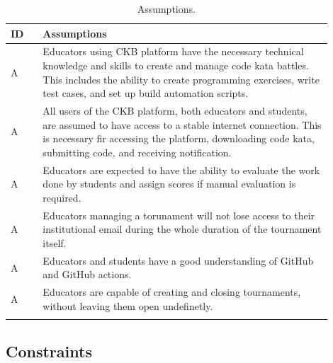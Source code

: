 \setcounter{ac}{0}
\newcommand{\ca}{\stepcounter{ac}\theac}

\newcommand{\myrow}[1]{
    A\ca & #1 \\
    \hline
}

\begin{center}
    \begin{longtable}{ |l|p{0.9\linewidth}| }
        \hline
        \textbf{ID} & \textbf{Assumptions}                                                                   \\
        \hline
        A\ca        & Educators using CKB platform have the necessary technical knowledge and skills to create and manage code kata battles. 
        This includes the ability to create programming exercises, write test cases, and set up build automation scripts.                                   \\
        \hline
        A\ca        & All users of the CKB platform, both educators and students, are assumed to have access to a stable internet connection. This is
         necessary fir accessing the platform, downloading code kata, submitting code, and receiving notification.                                  \\
        \hline
        A\ca        & Educators are expected to have the ability to evaluate the work done by students and assign scores if manual evaluation is required. \\
        \hline
        A\ca        & Educators managing a torunament will not lose access to their institutional email during the whole duration of the tournament itself.                                                             \\
        \hline
        A\ca        & Educators and students have a good understanding of GitHub and GitHub actions.                                  \\
        \hline
        A\ca        & Educators are capable of creating and closing tournaments, without leaving them open undefinetly.                      \\
        \hline
        \caption{Assumptions.}
        \label{tab:assumption_tab}%
    \end{longtable}
\end{center}

\subsection{Constraints}


